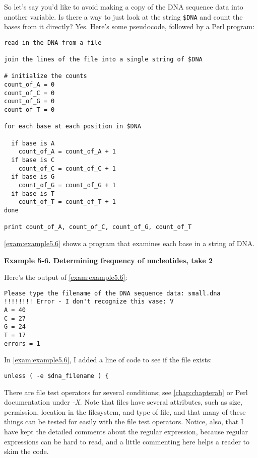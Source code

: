 So let's say you'd like to avoid making a copy of the DNA sequence data into another variable. Is there a way to just look at the string \verb|$DNA| and count the bases from it directly? Yes. Here's some pseudocode, followed by a Perl program: 

\begin{lstlisting}
read in the DNA from a file

join the lines of the file into a single string of $DNA

# initialize the counts
count_of_A = 0
count_of_C = 0
count_of_G = 0
count_of_T = 0

for each base at each position in $DNA

  if base is A
    count_of_A = count_of_A + 1
  if base is C
    count_of_C = count_of_C + 1
  if base is G
    count_of_G = count_of_G + 1
  if base is T
    count_of_T = count_of_T + 1
done

print count_of_A, count_of_C, count_of_G, count_of_T
\end{lstlisting}

\autoref{exam:example5.6} shows a program that examines each base in a string of DNA. 

\textbf{Example 5-6. Determining frequency of nucleotides, take 2}


Here's the output of \autoref{exam:example5.6}:

\begin{lstlisting}
Please type the filename of the DNA sequence data: small.dna
!!!!!!!! Error - I don't recognize this vase: V
A = 40
C = 27
G = 24
T = 17
errors = 1
\end{lstlisting}

In \autoref{exam:example5.6}, I added a line of code to see if the file exists:

\begin{lstlisting}
unless ( -e $dna_filename ) {
\end{lstlisting}

There are file test operators for several conditions; see \autoref{chap:chapterab} or Perl documentation under \textit{-X}. Note that files have several attributes, such as size, permission, location in the filesystem, and type of file, and that many of these things can be tested for easily with the file test operators.  
Notice, also, that I have kept the detailed comments about the regular expression, because regular expressions can be hard to read, and a little commenting here helps a reader to skim the code.

